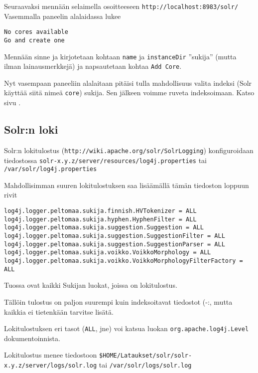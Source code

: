 \documentclass[12pt]{article}
\begin{document}
Seuraavaksi mennään selaimella osoitteeseen \verb=http://localhost:8983/solr/=
Vasemmalla paneelin alalaidassa lukee 

\begin{verbatim}
No cores available
Go and create one
\end{verbatim}

Mennään sinne ja kirjotetaan kohtaan \verb=name= ja \verb=instanceDir=
''sukija'' (mutta ilman lainausmerkkejä) ja napsautetaan kohtaa
\verb=Add Core=.

Nyt vasempaan paneeliin alalaitaan pitäisi tulla mahdollisuus valita
indeksi (Solr käyttää siitä nimeä \verb=core=) sukija. Sen jälkeen
voimme ruveta indeksoimaan. Katso sivu .


\subsection*{Solr:n loki}

Solr:n lokitulostus (\verb=http://wiki.apache.org/solr/SolrLogging=)
konfiguroidaan tiedostossa
\verb=solr-x.y.z/server/resources/log4j.properties= tai
\verb=/var/solr/log4j.properties=

Mahdollisimman suuren lokitulostuksen saa lisäämällä tämän tiedoston
loppuun rivit


{\footnotesize
\begin{verbatim}
log4j.logger.peltomaa.sukija.finnish.HVTokenizer = ALL
log4j.logger.peltomaa.sukija.hyphen.HyphenFilter = ALL
log4j.logger.peltomaa.sukija.suggestion.Suggestion = ALL
log4j.logger.peltomaa.sukija.suggestion.SuggestionFilter = ALL
log4j.logger.peltomaa.sukija.suggestion.SuggestionParser = ALL
log4j.logger.peltomaa.sukija.voikko.VoikkoMorphology = ALL
log4j.logger.peltomaa.sukija.voikko.VoikkoMorphologyFilterFactory = ALL
\end{verbatim}
}

Tuossa ovat kaikki Sukijan luokat, joissa on lokitulostus.

Tällöin tulostus on paljon suurempi kuin indeksoitavat tiedostot (-:,
mutta kaikkia ei tietenkään tarvitse lisätä.

Lokitulostuksen eri tasot (\verb=ALL=, jne) voi katsua luokan
\verb=org.apache.log4j.Level= dokumentoinnista.

Lokitulostus menee tiedostoon
\verb=$HOME/Lataukset/solr/solr-x.y.z/server/logs/solr.log= tai
\verb=/var/solr/logs/solr.log=
\end{document}
